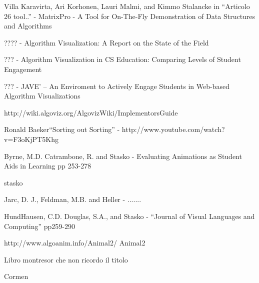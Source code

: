 \begin{thebibliography}{11}
Villa Karavirta, Ari Korhonen, Lauri Malmi, and Kimmo
Stalancke in {}``Articolo 26 tool..'' - MatrixPro - A Tool for On-The-Fly
Demonstration of Data Structures and Algorithms

???? - Algorithm Visualization: A Report on the State
of the Field

 ??? - Algorithm Visualization in CS Education: Comparing
Levels of Student Engagement

 ??? - JAVE' -- An Enviroment to Actively Engage Students
in Web-based Algorithm Visualizations

 http://wiki.algoviz.org/AlgovizWiki/ImplementorsGuide

 Ronald Baeker{}``Sorting out Sorting'' - http://www.youtube.com/watch?v=F3oKjPT5Khg 

 Byrne, M.D. Catrambone, R. and Stasko - Evaluating
Animations as Student Aids in Learning pp 253-278

 stasko 

 Jarc, D. J., Feldman, M.B. and Heller - .......

 HundHausen, C.D. Douglas, S.A., and Stasko - {}``Journal
of Visual Languages and Computing'' pp259-290

 http://www.algoanim.info/Animal2/ Animal2

 Libro montresor che non ricordo il titolo

 Cormen
\end{thebibliography}